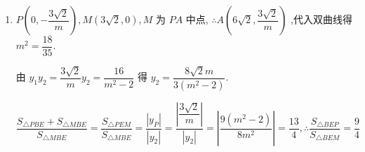 \begin{enumerate}
\begin{enumerate}
\begin{jieda}
\begin{enumerate}
                $\vv{AE} \cdot  \vv{BE} = 0$，即$\left( {{m}^{2} + 1}\right) {y}_{1}{y}_{2} + m\left( {t - \sqrt{2}}\right) \left( {{y}_{1} + {y}_{2}}\right)  + {\left( t - \sqrt{2}\right) }^{2} = 0$

                代入得$\dfrac{\left( {{m}^{2} + 1}\right) \left( {{t}^{2} - 2}\right) }{{m}^{2} - 2} - \dfrac{m\left( {t - \sqrt{2}}\right)  \cdot  {2mt}}{{m}^{2} - 2} + {\left( t - \sqrt{2}\right) }^{2} = 0$，即$\left( {t - \sqrt{2}}\right) \left( {3\sqrt{2} - t}\right)  = 0$
                
                当 $t = \sqrt{2}$ 时,直线 ${AB} : x = {my} + \sqrt{2}$ 经过点 $E$ ,不符条件,舍去.
                
                故直线 ${AB} : x = {my} + 3\sqrt{2}$ 必过定点 $M\left( {3\sqrt{2},0}\right)$ .
                
                \item $P\left( {0, - \dfrac{3\sqrt{2}}{m}}\right) ,M\left( {3\sqrt{2},0}\right) ,M$ 为 ${PA}$ 中点, $\therefore A\left( {6\sqrt{2},\dfrac{3\sqrt{2}}{m}}\right)$ ,代入双曲线得 ${m}^{2} = \dfrac{18}{35}$.
                
                由 ${y}_{1}{y}_{2} = \dfrac{3\sqrt{2}}{m}{y}_{2} = \dfrac{16}{{m}^{2} - 2}$ 得 ${y}_{2} = \dfrac{8\sqrt{2}m}{3\left( {{m}^{2} - 2}\right) }$.

                $\dfrac{{S}_{\bigtriangleup {PBE}} + {S}_{\bigtriangleup {MBE}}}{{S}_{\bigtriangleup {MBE}}} = \dfrac{{S}_{\bigtriangleup {PEM}}}{{S}_{\bigtriangleup {MBE}}} = \dfrac{\left| {y}_{P}\right| }{\left| {y}_{2}\right| } = \dfrac{\left| \dfrac{3\sqrt{2}}{m}\right| }{\left| {y}_{2}\right| } = \left| \dfrac{9\left( {{m}^{2} - 2}\right) }{8{m}^{2}}\right|  = \dfrac{13}{4},\therefore \dfrac{{S}_{\bigtriangleup {BEP}}}{{S}_{\bigtriangleup {BEM}}} = \dfrac{9}{4}$
            \end{enumerate}
        \end{jieda}


\end{enumerate}
\end{enumerate}
